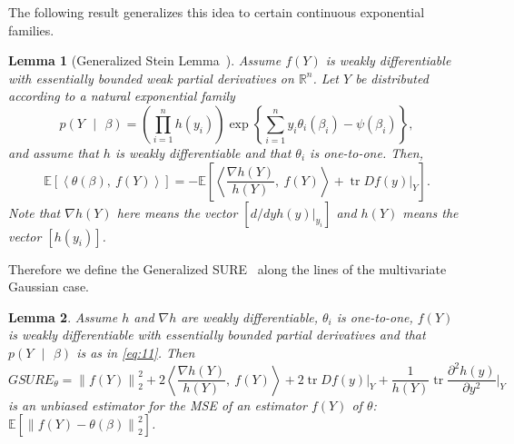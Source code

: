 \documentclass[11pt]{article}
\newcommand{\norm}[1]{\left\lVert #1 \right\rVert}
\newcommand{\R}{\mathbb{R}}
\newcommand{\E}{\mathbb{E}}
\newcommand{\Expect}[1]{\E\left[#1\right]}
\newcommand{\given}{\mbox{ }\vert\mbox{ }}
\DeclareMathOperator*{\trace}{tr}
\theoremstyle{plain}
\newtheorem{lemma}[lemma]{Lemma}
\begin{document}
The following result generalizes this idea to certain continuous
exponential families.
\begin{lemma}[Generalized Stein Lemma~\citep{Eldar2009}]
  \label{thm:g-stein-lemma}
  Assume $f(Y)$ is weakly differentiable with essentially
  bounded weak partial derivatives on $\R^n$. Let $Y$ be distributed
  according to a natural exponential family
  \begin{equation}
    \label{eq:11}
    p(Y \given \beta) = \left(\prod_{i=1}^n h(y_i)\right)\exp\left\{
    \sum_{i=1}^n y_i \theta_i(\beta_i) -\psi(\beta_i) \right\},
  \end{equation}
  and assume that $h$ is weakly differentiable and that $\theta_i$ is
  one-to-one. Then,
  \begin{equation}
    \label{eq:12}
    \Expect{\left\langle \theta(\beta),\ f(Y)\right\rangle} = - \Expect{
      \left\langle\frac{\nabla h(Y)}{h(Y)},\ f(Y)\right\rangle + \trace Df(y) \bigg\vert_Y}.
  \end{equation}
Note that $\nabla h(Y)$ here means the vector $[d/dy h(y)
\vert_{y_i}]$ and $h(Y)$ means the vector $[h(y_i)]$.
\end{lemma}
Therefore we define the Generalized SURE~\citep{Eldar2009} along the lines of the multivariate Gaussian case.
\begin{lemma}
  \label{lem:gsure}
  Assume $h$ and $\nabla h$ are weakly differentiable, $\theta_i$ is one-to-one,
  $f(Y)$ is weakly differentiable with essentially bounded partial
  derivatives and that $p(Y\given\beta)$ is as in \eqref{eq:11}. Then
  \begin{equation}
    \label{eq:13}
    GSURE_{\theta} = \norm{f(Y)}^2_2 + 2 \left\langle\frac{\nabla
        h(Y)}{h(Y)},\ f(Y)\right\rangle + 2\trace Df(y) \bigg\vert_Y +
    \frac{1}{h(Y)} \trace \frac{\partial^2 h(y)}{\partial y^2}\bigg\vert_Y
  \end{equation}
  is an unbiased estimator for the MSE of an estimator $f(Y)$ of
  $\theta$: $\Expect{\norm{f(Y) - \theta(\beta)}_2^2}$.
\end{lemma}
\end{document}
